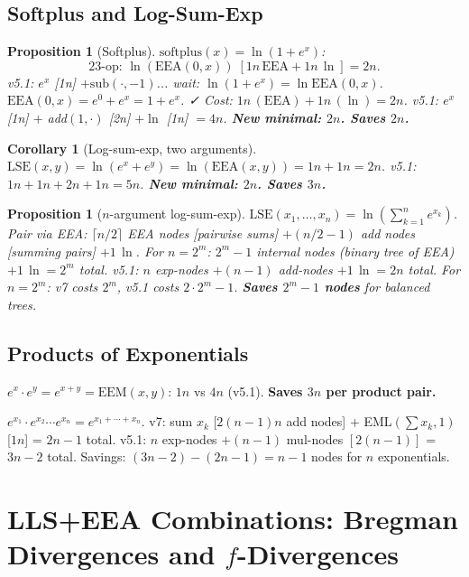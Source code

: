 \documentclass[11pt]{article}
\newtheorem{proposition}[theorem]{Proposition}
\newtheorem{corollary}[theorem]{Corollary}
\begin{document}
\subsection{Softplus and Log-Sum-Exp}

\begin{proposition}[Softplus]
$\mathrm{softplus}(x)=\ln(1+e^x)$:
\[
\text{23-op: }\ln(\mathrm{EEA}(0,x))\;[1n\,\mathrm{EEA}+1n\,\ln]=2n.
\]
v5.1: $e^x$ [1n] $+\mathrm{sub}(\cdot,-1)$... wait: $\ln(1+e^x)=\ln\mathrm{EEA}(0,x)$.
$\mathrm{EEA}(0,x)=e^0+e^x=1+e^x$. ✓ Cost: $1n\,(\mathrm{EEA})+1n\,(\ln)=2n$.
v5.1: $e^x$ [1n] $+$ add$(1,\cdot)$ [2n] $+\ln$ [1n] $=4n$.
\textbf{New minimal: $2n$. Saves $2n$.}
\end{proposition}

\begin{corollary}[Log-sum-exp, two arguments]
$\mathrm{LSE}(x,y)=\ln(e^x+e^y)=\ln(\mathrm{EEA}(x,y))=1n+1n=2n$.
v5.1: $1n+1n+2n+1n=5n$.
\textbf{New minimal: $2n$. Saves $3n$.}
\end{corollary}

\begin{proposition}[$n$-argument log-sum-exp]
$\mathrm{LSE}(x_1,\ldots,x_n)=\ln\!\left(\sum_{k=1}^n e^{x_k}\right)$.
Pair via EEA: $\lceil n/2\rceil$ EEA nodes [pairwise sums] $+(n/2-1)$ add nodes [summing pairs] $+1\,\ln$.
For $n=2^m$: $2^m-1$ internal nodes (binary tree of EEA) $+1\,\ln = 2^m$ total.
v5.1: $n$ exp-nodes $+(n-1)$ add-nodes $+1\,\ln = 2n$ total.
For $n=2^m$: v7 costs $2^m$, v5.1 costs $2\cdot 2^m-1$. \textbf{Saves $2^m-1$ nodes} for balanced trees.
\end{proposition}

\subsection{Products of Exponentials}

$e^x\cdot e^y=e^{x+y}=\mathrm{EEM}(x,y)$: $1n$ vs $4n$ (v5.1). \textbf{Saves $3n$ per product pair.}

$e^{x_1}\cdot e^{x_2}\cdots e^{x_n}=e^{x_1+\cdots+x_n}$.
v7: sum $x_k$ [$2(n-1)n$ add nodes] $+$ EML$(\sum x_k, 1)$ [$1n$] = $2n-1$ total.
v5.1: $n$ exp-nodes $+(n-1)$ mul-nodes $[2(n-1)]$ = $3n-2$ total.
Savings: $(3n-2)-(2n-1)=n-1$ nodes for $n$ exponentials.

\section{LLS+EEA Combinations: Bregman Divergences and $f$-Divergences}
\end{document}
